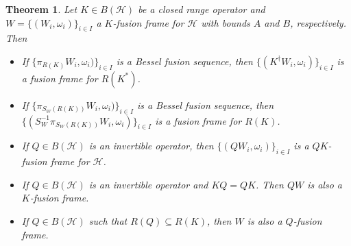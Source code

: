 \documentclass{birkjour}
\newtheorem{thm}{Theorem}[section]
\theoremstyle{definition}
\theoremstyle{remark}
\numberwithin{equation}{section}
\begin{document}
\begin{thm}\label{4part}
Let $K\in B(\mathcal{H})$ be a closed range operator and  $W=\lbrace (W_{i}, \omega_{i})\rbrace_{i\in I}$  a $K$-fusion frame for
$\mathcal{H}$ with bounds $A$ and $B$, respectively. Then
\begin{itemize}
\item[(i)] If $\lbrace\pi_{R(K)}W_{i},\omega_{i})\rbrace_{i\in I}$ is a Bessel fusion sequence, then $\lbrace (K^{\dag}W_{i},
    \omega_{i})\rbrace_{i\in I}$ is a fusion
    frame for $R(K^{*})$.
\item[(ii)] If $\lbrace\pi_{S_{W}(R(K))}W_{i},\omega_{i})\rbrace_{i\in I}$ is a Bessel fusion  sequence, then  $\lbrace
    (S_{W}^{-1}\pi_{S_{W}(R(K))}W_{i},
    \omega_{i})\rbrace_{i\in I}$
    is a
    fusion
    frame for $R(K)$.
    \item[(iii)]
    If $Q\in B(\mathcal{H})$ is an invertible operator, then $\lbrace (QW_{i}, \omega_{i})\rbrace_{i\in I}$ is a $QK$-fusion frame for $\mathcal{H}$.
  \item[(iv)]
    If $Q\in B(\mathcal{H})$  is an invertible operator and $KQ=QK$. Then $QW$ is also a $K$-fusion frame.
    \item[(v)]
    If $Q\in B(\mathcal{H})$ such that $R(Q)\subseteq R(K)$, then $W$ is also a $Q$-fusion frame.
\end{itemize}
\end{thm}
\end{document}
